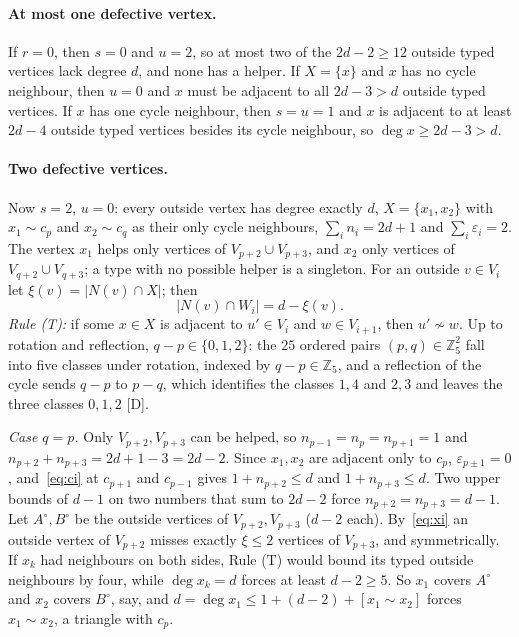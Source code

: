 \documentclass[11pt]{article}
\theoremstyle{remark}
\begin{document}
\paragraph{At most one defective vertex.} If $r=0$, then $s=0$ and $u=2$, so at most two of the $2d-2\ge12$ outside typed vertices lack degree $d$, and none has a helper. If $X=\{x\}$ and $x$ has no cycle neighbour, then $u=0$ and $x$ must be adjacent to all $2d-3>d$ outside typed vertices. If $x$ has one cycle neighbour, then $s=u=1$ and $x$ is adjacent to at least $2d-4$ outside typed vertices besides its cycle neighbour, so $\deg x\ge2d-3>d$.

\paragraph{Two defective vertices.} Now $s=2$, $u=0$: every outside vertex has degree exactly $d$, $X=\{x_1,x_2\}$ with $x_1\sim c_p$ and $x_2\sim c_q$ as their only cycle neighbours, $\sum_in_i=2d+1$ and $\sum_i\varepsilon_i=2$. The vertex $x_1$ helps only vertices of $V_{p+2}\cup V_{p+3}$, and $x_2$ only vertices of $V_{q+2}\cup V_{q+3}$; a type with no possible helper is a singleton. For an outside $v\in V_i$ let $\xi(v)=|N(v)\cap X|$; then
\begin{equation}\label{eq:xi}
|N(v)\cap W_i|=d-\xi(v).
\end{equation}
\emph{Rule (T):} if some $x\in X$ is adjacent to $u'\in V_i$ and $w\in V_{i+1}$, then $u'\not\sim w$. Up to rotation and reflection, $q-p\in\{0,1,2\}$: the $25$ ordered pairs $(p,q)\in\mathbb Z_5^2$ fall into five classes under rotation, indexed by $q-p\in\mathbb Z_5$, and a reflection of the cycle sends $q-p$ to $p-q$, which identifies the classes $1,4$ and $2,3$ and leaves the three classes $0,1,2$ [D].

\emph{Case $q=p$.} Only $V_{p+2},V_{p+3}$ can be helped, so $n_{p-1}=n_p=n_{p+1}=1$ and $n_{p+2}+n_{p+3}=2d+1-3=2d-2$. Since $x_1,x_2$ are adjacent only to $c_p$, $\varepsilon_{p\pm1}=0$, and~\eqref{eq:ci} at $c_{p+1}$ and $c_{p-1}$ gives $1+n_{p+2}\le d$ and $1+n_{p+3}\le d$. Two upper bounds of $d-1$ on two numbers that sum to $2d-2$ force $n_{p+2}=n_{p+3}=d-1$. Let $A^\circ,B^\circ$ be the outside vertices of $V_{p+2},V_{p+3}$ ($d-2$ each). By~\eqref{eq:xi} an outside vertex of $V_{p+2}$ misses exactly $\xi\le2$ vertices of $V_{p+3}$, and symmetrically. If $x_k$ had neighbours on both sides, Rule (T) would bound its typed outside neighbours by four, while $\deg x_k=d$ forces at least $d-2\ge5$. So $x_1$ covers $A^\circ$ and $x_2$ covers $B^\circ$, say, and $d=\deg x_1\le1+(d-2)+[x_1\sim x_2]$ forces $x_1\sim x_2$, a triangle with $c_p$.
\end{document}
